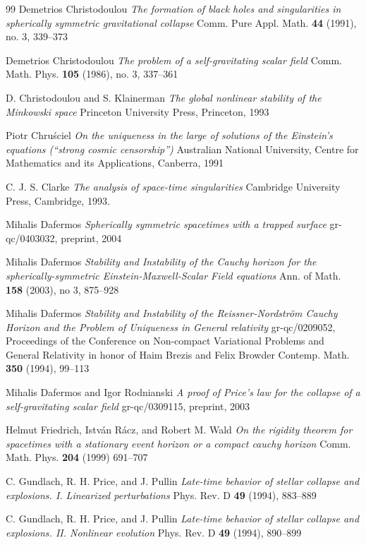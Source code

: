 \documentclass{article}
\begin{document}
{\begin{thebibliography}{99}
 Demetrios Christodoulou \emph{The formation
of black holes and singularities in spherically symmetric gravitational
collapse} Comm. Pure Appl. Math. {\bf 44} (1991), no. 3, 339--373

 Demetrios Christodoulou \emph{The problem
of a self-gravitating scalar field} Comm. Math. Phys. {\bf 105}
(1986), no. 3, 337--361

 D. Christodoulou and S. Klainerman \emph{The 
global nonlinear stability of the Minkowski space}
Princeton University Press, Princeton, 1993

 Piotr Chru\'sciel \emph{On the uniqueness in
the large of solutions of the Einstein's equations (``strong
cosmic censorship'')} Australian National
University, Centre for Mathematics and its Applications,
Canberra, 1991

 C. J. S. Clarke \emph{The analysis of
space-time singularities} Cambridge University Press,
Cambridge, 1993.

 Mihalis Dafermos \emph{Spherically
symmetric spacetimes with a trapped surface} gr-qc/0403032, 
preprint, 2004


 Mihalis Dafermos \emph{Stability and Instability
of the Cauchy horizon for the spherically-symmetric Einstein-Maxwell-Scalar
Field equations} Ann. of Math. {\bf 158} (2003), no 3,
875--928

 Mihalis Dafermos \emph{Stability and Instability
of the Reissner-Nordstr\"om Cauchy Horizon and the Problem of Uniqueness
in General relativity} gr-qc/0209052, Proceedings
of the Conference on Non-compact Variational Problems and
General Relativity in honor of Haim Brezis and Felix Browder
Contemp. Math. {\bf 350} (1994), 99--113

 Mihalis Dafermos and Igor Rodnianski
\emph{A proof of Price's law for the collapse
of a self-gravitating scalar field} gr-qc/0309115, preprint, 2003

 Helmut Friedrich, Istv\'an R\'acz, and
Robert M. Wald \emph{On the rigidity theorem for spacetimes
with a stationary event horizon or a compact cauchy horizon}
Comm. Math. Phys. {\bf 204} (1999) 691--707

 C. Gundlach, R. H. Price, and J. Pullin
\emph{Late-time behavior of stellar collapse and explosions. I.
Linearized perturbations} Phys. Rev. D {\bf 49} (1994), 883--889

 C. Gundlach, R. H. Price, and J. Pullin
\emph{Late-time behavior of stellar collapse and explosions. II.
Nonlinear evolution} Phys. Rev. D {\bf 49} (1994), 890--899


\end{thebibliography}}
\end{document}
